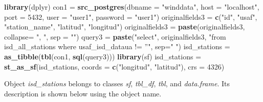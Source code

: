 \documentclass[12pt,oneside]{reedthesis}
\newenvironment{Shaded}{\begin{snugshade}}{\end{snugshade}}
\newcommand{\DataTypeTok}[1]{\textcolor[rgb]{0.13,0.29,0.53}{#1}}
\newcommand{\DecValTok}[1]{\textcolor[rgb]{0.00,0.00,0.81}{#1}}
\newcommand{\KeywordTok}[1]{\textcolor[rgb]{0.13,0.29,0.53}{\textbf{#1}}}
\newcommand{\NormalTok}[1]{#1}
\newcommand{\StringTok}[1]{\textcolor[rgb]{0.31,0.60,0.02}{#1}}
\begin{document}
\vspace{0.4cm}
\begin{Shaded}
\begin{Highlighting}[]
    \KeywordTok{library}\NormalTok{(dplyr)}
\NormalTok{    con1 =}\StringTok{ }\KeywordTok{src_postgres}\NormalTok{(}\DataTypeTok{dbname =} \StringTok{"winddata"}\NormalTok{, }\DataTypeTok{host =} \StringTok{"localhost"}\NormalTok{, }
                        \DataTypeTok{port =} \DecValTok{5432}\NormalTok{, }\DataTypeTok{user =} \StringTok{"user1"}\NormalTok{, }\DataTypeTok{password =} \StringTok{"user1"}\NormalTok{)}
\NormalTok{    originalfields3 =}\StringTok{ }\KeywordTok{c}\NormalTok{(}\StringTok{"id"}\NormalTok{, }\StringTok{"usaf"}\NormalTok{, }\StringTok{"station_name"}\NormalTok{, }\StringTok{"latitud"}\NormalTok{, }\StringTok{"longitud"}\NormalTok{)}
\NormalTok{    originalfields3 =}\StringTok{ }\KeywordTok{paste}\NormalTok{(originalfields3, }\DataTypeTok{collapse=} \StringTok{", "}\NormalTok{, }\DataTypeTok{sep =} \StringTok{""}\NormalTok{)}
\NormalTok{    query3 =}\StringTok{ }\KeywordTok{paste}\NormalTok{(}\StringTok{"select"}\NormalTok{, originalfields3, }
                   \StringTok{"from isd_all_stations where usaf_isd_dataua != ''"}\NormalTok{, }\DataTypeTok{sep=}\StringTok{" "}\NormalTok{)}
\NormalTok{    isd_stations =}\StringTok{ }\KeywordTok{as_tibble}\NormalTok{(}\KeywordTok{tbl}\NormalTok{(con1, }\KeywordTok{sql}\NormalTok{(query3)))}
    \KeywordTok{library}\NormalTok{(sf)}
\NormalTok{    isd_stations =}\StringTok{ }\KeywordTok{st_as_sf}\NormalTok{(isd_stations, }\DataTypeTok{coords =} \KeywordTok{c}\NormalTok{(}\StringTok{"longitud"}\NormalTok{, }\StringTok{"latitud"}\NormalTok{), }\DataTypeTok{crs =} \DecValTok{4326}\NormalTok{)}
\end{Highlighting}
\end{Shaded}
\normalsize

Object \emph{isd\_stations} belongs to classes \emph{sf}, \emph{tbl\_df}, \emph{tbl}, and \emph{data.frame}. Its description is shown below using the object name.

\scriptsize
\end{document}
